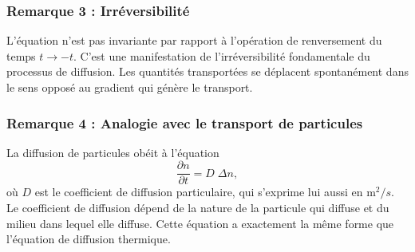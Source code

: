 \documentclass[11pt,a4paper]{report}
\begin{document}
\subsubsection{Remarque 3 : Irréversibilité}
L'équation n'est pas invariante par rapport à l'opération de renversement du temps $t \rightarrow -t$. C'est une manifestation de l'irréversibilité fondamentale du processus de diffusion. Les quantités transportées se déplacent spontanément dans le sens opposé au gradient qui génère le transport.

\subsubsection{Remarque 4 : Analogie avec le transport de particules}

La diffusion de particules obéit à l'équation 
\begin{equation}
	\frac{\partial n}{\partial t} = D\;\Delta n,
\end{equation}
où $D$ est le coefficient de diffusion particulaire, qui s'exprime lui aussi en $\text{m}^2/s$. Le coefficient de diffusion dépend de la nature de la particule qui diffuse et du milieu dans lequel elle diffuse. Cette équation a exactement la même forme que l'équation de diffusion thermique.
\end{document}
